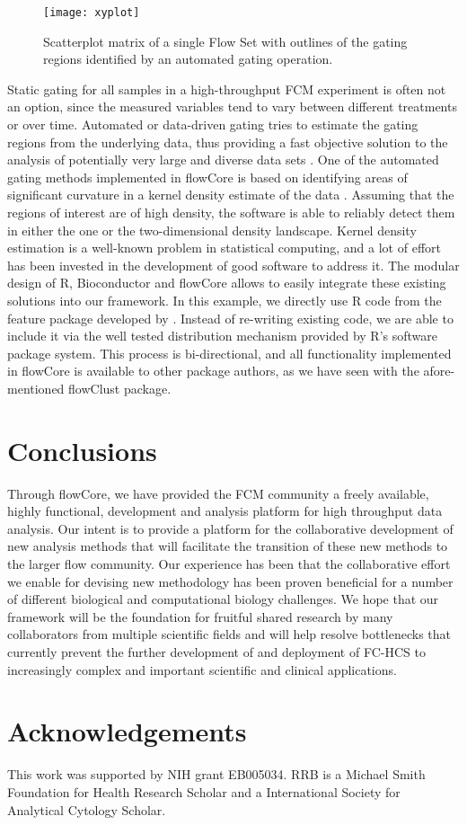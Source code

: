 \documentclass[12pt]{article}
\begin{document}
\begin{figure}[htbp]
\centering
\texttt{[image: xyplot]}
\caption{\label{xyplot}%
Scatterplot matrix of a single Flow Set with outlines of the gating
regions identified by an automated gating operation.}
\end{figure}

Static gating for all samples in a high-throughput FCM experiment is
often not an option, since the measured variables tend to vary between
different treatments or over time. Automated or data-driven gating
tries to estimate the gating regions from the underlying data, thus
providing a fast objective solution to the analysis of potentially
very large and diverse data sets \cite{lo2008agf}. One of the
automated gating methods implemented in flowCore is based on
identifying areas of significant curvature in a kernel density
estimate of the data \citep{wand2008}. Assuming that the regions of
interest are of high density, the software is able to reliably detect
them in either the one or the two-dimensional density
landscape. Kernel density estimation is a well-known problem in
statistical computing, and a lot of effort has been invested in the
development of good software to address it. The modular design of R,
Bioconductor and flowCore allows to easily integrate these existing
solutions into our framework. In this example, we directly use R code
from the feature package developed by \cite{wand2008}. Instead of
re-writing existing code, we are able to include it via the well
tested distribution mechanism provided by R's software package
system. This process is bi-directional, and all functionality
implemented in flowCore is available to other package authors, as we
have seen with the afore-mentioned flowClust package.

\section*{Conclusions}

Through flowCore, we have provided the FCM community a freely
available, highly functional, development and analysis platform for high
throughput data analysis. Our intent is to provide a platform
for the collaborative development of new analysis methods that
will facilitate the transition of these new methods to the larger 
flow community. Our experience has been that the 
collaborative effort we enable for devising new methodology has been proven
beneficial for a number of different biological and computational biology challenges. 
We hope that our
framework will be the foundation for fruitful shared research by many
collaborators from multiple scientific fields and will help resolve
bottlenecks that currently prevent the further development of and deployment of
FC-HCS to increasingly complex and important scientific and clinical 
applications. 

\section*{Acknowledgements}
This work was supported by NIH grant EB005034. RRB is a Michael Smith
Foundation for Health Research Scholar and a International Society for
Analytical Cytology Scholar.

  
 
\end{document}
